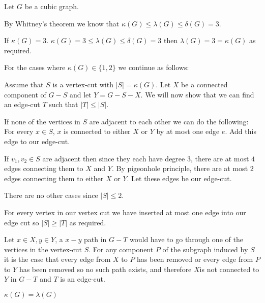 Let $G$ be a cubic graph. 

By Whitney's theorem we know that $\kappa(G) \le \lambda(G) \le \delta(G) = 3 $.

If $\kappa(G) = 3$. $\kappa(G) = 3 \le \lambda(G) \le \delta(G) = 3$
then $\lambda(G) = 3 = \kappa(G)$ as required.

For the cases where $\kappa(G) \in \{1, 2\}$ we continue as follows:

Assume that $S$ is a vertex-cut with $|S| = \kappa(G)$. Let $X$ be a connected
component of $G-S$ and let $Y=G-S-X$.
We will now show that we can find an edge-cut $T$ such that $|T| \le |S|$.

If none of the vertices in $S$ are adjacent to each other we can do the following:
For every $x \in S$, $x$ is connected to either $X$ or $Y$ by at most one edge $e$. 
Add this edge to our edge-cut.

If $v_1, v_2 \in S$ are adjacent then since they each have degree $3$, there
are at most $4$ edges connecting them to $X$ and $Y$. By pigeonhole principle,
there are at most $2$ edges connecting them to either $X$ or $Y$. Let these
edges be our edge-cut.

There are no other cases since $|S| \le 2$.

For every vertex in our vertex cut we have inserted at most one edge into our edge
cut so $|S| \ge |T|$ as required. 

Let $x\in X, y \in Y$, a $x-y$ path in $G-T$ would have to go through one of the
vertices in the vertex-cut $S$. For any component $P$ of the subgraph induced by $S$ it is the
case that every edge from $X$ to $P$ has been removed or every edge
from $P$ to $Y$ has been removed so no such path
exists, and therefore $X$is not connected to $Y$ in $G-T$ and $T$ is an edge-cut.

$\kappa(G) = \lambda(G)$

